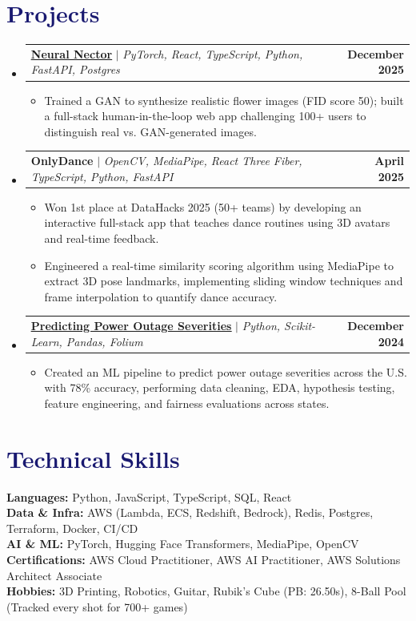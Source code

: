 \documentclass[letterpaper,11pt]{article}
\makeatletter
\newcommand{\resumeItem}[1]{
  \item\small{
    {#1 \vspace{-2pt}}
  }
}
\newcommand{\resumeProjectHeading}[2]{
    \item
    \begin{tabular*}{1.001\textwidth}{l@{\extracolsep{\fill}}r}
      \small#1 & \textbf{\small #2}\\
    \end{tabular*}\vspace{-7pt}
}
\newcommand{\resumeSubHeadingListStart}{\begin{itemize}[leftmargin=0.0in, label={}]}
\newcommand{\resumeSubHeadingListEnd}{\end{itemize}}
\newcommand{\resumeItemListStart}{\begin{itemize}}
\newcommand{\resumeItemListEnd}{\end{itemize}\vspace{-5pt}}
\newcommand\accentColor{MidnightBlue}
\makeatother
\begin{document}
\section{\textcolor{\accentColor}{Projects}}
\vspace{-7pt}
\resumeSubHeadingListStart
\resumeProjectHeading
{\textbf{\href{https://neuralnector.issacroy.com}{\underline{Neural Nector}}} $|$ \emph{PyTorch, React, TypeScript, Python, FastAPI, Postgres}}{December 2025}
\resumeItemListStart
\resumeItem{Trained a GAN to synthesize realistic flower images (FID score 50); built a full-stack human-in-the-loop web app challenging 100+ users to distinguish real vs. GAN-generated images.}
\resumeItemListEnd
\vspace{-15pt}

\resumeProjectHeading
{\textbf{OnlyDance} $|$ \emph{OpenCV, MediaPipe, React Three Fiber, TypeScript, Python, FastAPI}}{April 2025}
\resumeItemListStart
\resumeItem{Won 1st place at DataHacks 2025 (50+ teams) by developing an interactive full-stack app that teaches dance routines using 3D avatars and real-time feedback.}
\resumeItem{Engineered a real-time similarity scoring algorithm using MediaPipe to extract 3D pose landmarks, implementing sliding window techniques and frame interpolation to quantify dance accuracy.}
\resumeItemListEnd
\vspace{-15pt}

\resumeProjectHeading
{\textbf{\href{https://theboyroy05.github.io/Power-Outages/}{\underline{Predicting Power Outage Severities}}} $|$ \emph{Python, Scikit-Learn, Pandas, Folium}}{December 2024}
\resumeItemListStart
\resumeItem{Created an ML pipeline to predict power outage severities across the U.S. with 78\% accuracy, performing data cleaning, EDA, hypothesis testing, feature engineering, and fairness evaluations across states.}
\resumeItemListEnd
\resumeSubHeadingListEnd
\vspace{-15pt}

\section{\textcolor{\accentColor}{Technical Skills}}
\begin{itemize}[leftmargin=0.15in, label={}]
  \small{\item{
        \textbf{Languages: }{Python, JavaScript, TypeScript, SQL, React} \\
        \textbf{Data \& Infra: }{AWS (Lambda, ECS, Redshift, Bedrock), Redis, Postgres, Terraform, Docker, CI/CD} \\
        \textbf{AI \& ML: }{PyTorch, Hugging Face Transformers, MediaPipe, OpenCV} \\
        \textbf{Certifications: }{AWS Cloud Practitioner, AWS AI Practitioner, AWS Solutions Architect Associate} \\
        \textbf{Hobbies: }{3D Printing, Robotics, Guitar, Rubik's Cube (PB: 26.50s), 8-Ball Pool (Tracked every shot for 700+ games)}
        }}
\end{itemize}
\vspace{-10pt}
\end{document}
